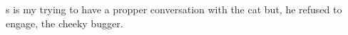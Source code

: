 s is my trying to have a propper conversation with the cat but, he refused to engage, the cheeky bugger. 
